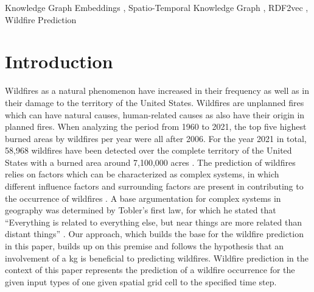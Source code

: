 \documentclass[
]{ceurart}
\begin{document}
\begin{keywords}
  Knowledge Graph Embeddings \sep
  Spatio-Temporal Knowledge Graph \sep
  RDF2vec \sep
  Wildfire Prediction
\end{keywords}

\maketitle

\section{Introduction}
Wildfires as a natural phenomenon have increased in their frequency as well as in their damage to the territory of the United States. Wildfires are unplanned fires which can have natural causes, human-related causes as also have their origin in planned fires. When analyzing the period from 1960 to 2021, the top five highest burned areas by wildfires per year were all after 2006. For the year 2021 in total, 58,968 wildfires have been detected over the complete territory of the United States with a burned area around 7,100,000 acres \cite{Hoover.2021}. The prediction of wildfires relies on factors which can be characterized as complex systems, in which different influence factors and surrounding factors are present in contributing to the occurrence of wildfires \cite{Pastor.2003}. A base argumentation for complex systems in geography was determined by Tobler's first law, for which he stated that “Everything is related to everything else, but near things are more related than distant things” \cite{Tobler.1970}. Our approach, which builds the base for the wildfire prediction in this paper, builds up on this premise and follows the hypothesis that an involvement of a \gls*{kg} is beneficial to predicting wildfires. Wildfire prediction in the context of this paper represents the prediction of a wildfire occurrence for the given input types of one given spatial grid cell to the specified time step.
\end{document}
